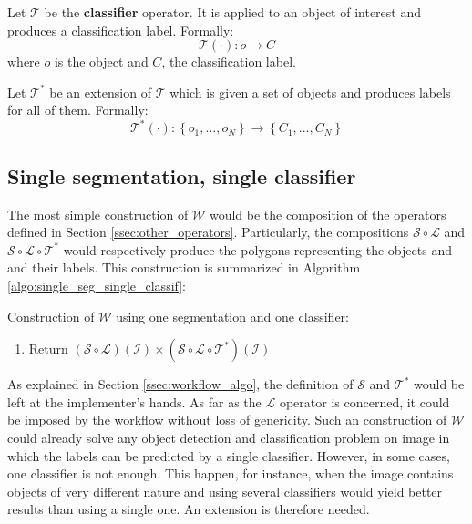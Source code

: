\begin{definition} Let $\mathcal{T}$ be the \textbf{classifier} operator. It is applied to an object of interest and produces a classification label. Formally:
\begin{equation}
	\mathcal{T}(\cdot) : o \rightarrow C
\end{equation}
where $o$ is the object and $C$, the classification label. 
\end{definition}
\begin{definition}
Let $\mathcal{T}^*$ be an extension of $\mathcal{T}$ which is given a set of objects and produces labels for all of them. Formally: 
\begin{equation}
	\mathcal{T}^*(\cdot) : \left\{o_1, ..., o_N\right\}  \rightarrow \left\{C_1, ..., C_N\right\}
\end{equation}
\end{definition}

\subsection{Single segmentation, single classifier}
\label{ssec:single_single}

The most simple construction of $\mathcal{W}$ would be the composition of the operators defined in Section \ref{ssec:other_operators}. Particularly, the compositions $\mathcal{S} \circ \mathcal{L}$ and $\mathcal{S} \circ \mathcal{L} \circ \mathcal{T}^*$ would respectively produce the polygons representing the objects and and their labels. This construction is summarized in Algorithm \ref{algo:single_seg_single_classif}: 

\begin{algorithm} \label{algo:single_seg_single_classif} 
	Construction of $\mathcal{W}$ using one segmentation and one classifier:
	
	\begin{enumerate}
		\item Return $\left(\mathcal{S} \circ \mathcal{L}\right)\left(\mathcal{I}\right) \times \left(\mathcal{S} \circ \mathcal{L} \circ \mathcal{T}^*\right)\left(\mathcal{I}\right)$
	\end{enumerate}
\end{algorithm}

As explained in Section \ref{ssec:workflow_algo}, the definition of $\mathcal{S}$ and $\mathcal{T}^*$ would be left at the implementer's hands. As far as the $\mathcal{L}$ operator is concerned, it could be imposed by the workflow without loss of genericity. Such an construction of $\mathcal{W}$ could already solve any object detection and classification problem on image in which the labels can be predicted by a single classifier. However, in some cases, one classifier is not enough. This happen, for instance, when the image contains objects of very different nature and using several classifiers would yield better results than using a single one. An extension is therefore needed.

